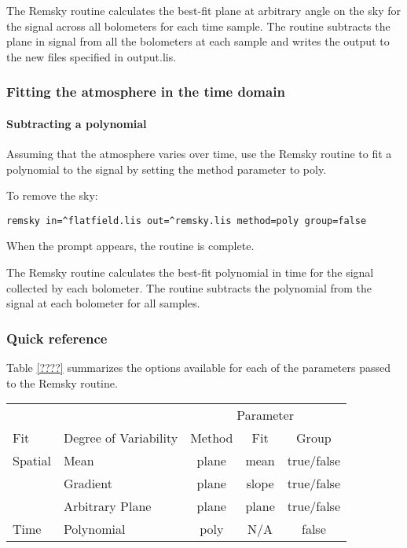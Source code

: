 \documentclass[twoside,11pt]{article}
\renewcommand{\_}{\texttt{\symbol{95}}}
\begin{document}
The Remsky routine calculates the best-fit plane at arbitrary angle on
the sky for the signal across all bolometers for each time sample. The
routine subtracts the plane in signal from all the bolometers at each
sample and writes the output to the new files specified in output.lis.

\subsubsection{Fitting the atmosphere in the time domain}

\paragraph{Subtracting a polynomial}

Assuming that the atmosphere varies over time, use the Remsky routine
to fit a polynomial to the signal by setting the method parameter to
poly.

To remove the sky:
\begin{verbatim}
remsky in=^flatfield.lis out=^remsky.lis method=poly group=false
\end{verbatim}
When the prompt appears, the routine is complete.


The Remsky routine calculates the best-fit polynomial in time for the
signal collected by each bolometer. The routine subtracts the
polynomial from the signal at each bolometer for all samples.

\subsubsection{Quick reference}

Table \ref{????} summarizes the options available for each of the
parameters passed to the Remsky routine.

\begin{table}
\begin{tabular}{llccc}
\hline
        &                        & \multicolumn{3}{c}{Parameter} \\
Fit     & Degree of Variability  & Method  & Fit & Group\\
\hline
Spatial & Mean            & plane & mean  & true/false \\
        & Gradient        & plane & slope & true/false \\
        & Arbitrary Plane & plane & plane & true/false \\
Time    & Polynomial      & poly  & N/A   &    false \\
\hline
\end{tabular}
\end{table}
\end{document}
